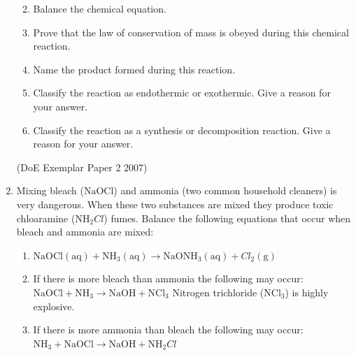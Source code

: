 \begin{enumerate}[noitemsep, label=\textbf{\arabic*}. ]
\begin{enumerate}[noitemsep, label=\textbf{\alph*}. ]
            \label{m38727*uid49}\item Balance the chemical equation.
\label{m38727*uid50}\item Prove that the law of conservation of mass is obeyed during this chemical reaction.
\label{m38727*uid51}\item Name the product formed during this reaction.
\label{m38727*uid52}\item Classify the reaction as endothermic or exothermic. Give a reason for your answer.
\label{m38727*uid53}\item Classify the reaction as a synthesis or decomposition reaction. Give a reason for your answer.
        \end{enumerate}
        
(DoE Exemplar Paper 2 2007)
\item Mixing bleach (\begin{math}\mathrm{NaOCl}\end{math}) and ammonia (two common household cleaners) is very dangerous. When these two substances are mixed they produce toxic chloaramine (\begin{math}{\mathrm{NH}}_{2}Cl\end{math}) fumes. Balance the following equations that occur when bleach and ammonia are mixed:\label{m38727*id6432}\begin{enumerate}[noitemsep, label=\textbf{\alph*}. ] 
            \item \begin{math}\mathrm{NaOCl}\left(\mathrm{aq}\right)+{\mathrm{NH}}_{3}\left(\mathrm{aq}\right)\to {\mathrm{NaONH}}_{3}\left(\mathrm{aq}\right)+{Cl}_{2}\left(\mathrm{g}\right)\end{math}\item If there is more bleach than ammonia the following may occur:
\begin{math}\mathrm{NaOCl}+{\mathrm{NH}}_{3}\to \mathrm{NaOH}+{\mathrm{NCl}}_{3}\end{math}
\newline
    Nitrogen trichloride (\begin{math}{\mathrm{NCl}}_{3}\end{math}) is highly explosive.\item If there is more ammonia than bleach the following may occur:
\begin{math}{\mathrm{NH}}_{3}+\mathrm{NaOCl}\to \mathrm{NaOH}+{\mathrm{NH}}_{2}Cl\end{math}\newline
    

\end{enumerate}
\end{enumerate}
